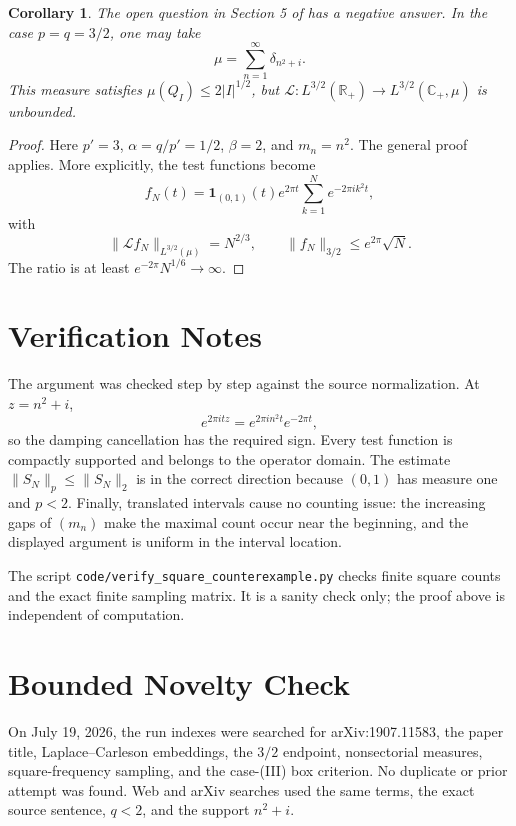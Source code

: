 \documentclass[11pt]{article}
\newtheorem{corollary}{Corollary}
\newcommand{\R}{\mathbb R}
\newcommand{\C}{\mathbb C}
\begin{document}
\begin{corollary}\label{cor:source}
The open question in Section 5 of \cite{Rydhe} has a negative answer.  In the
case $p=q=3/2$, one may take
\[
 \mu=\sum_{n=1}^\infty\delta_{n^2+i}.
\]
This measure satisfies $\mu(Q_I)\le2|I|^{1/2}$, but
$\mathcal L:L^{3/2}(\R_+)\to L^{3/2}(\C_+,\mu)$ is unbounded.
\end{corollary}

\begin{proof}
Here $p'=3$, $\alpha=q/p'=1/2$, $\beta=2$, and $m_n=n^2$.  The general proof
applies.  More explicitly, the test functions become
\[
 f_N(t)=\mathbf 1_{(0,1)}(t)e^{2\pi t}
        \sum_{k=1}^N e^{-2\pi i k^2t},
\]
with
\[
 \|\mathcal Lf_N\|_{L^{3/2}(\mu)}=N^{2/3},
 \qquad
 \|f_N\|_{3/2}\le e^{2\pi}\sqrt N.
\]
The ratio is at least $e^{-2\pi}N^{1/6}\to\infty$.
\end{proof}

\section*{Verification Notes}

The argument was checked step by step against the source normalization.  At
$z=n^2+i$,
\[
 e^{2\pi i t z}=e^{2\pi i n^2t}e^{-2\pi t},
\]
so the damping cancellation has the required sign.  Every test function is
compactly supported and belongs to the operator domain.  The estimate
$\|S_N\|_p\le\|S_N\|_2$ is in the correct direction because $(0,1)$ has
measure one and $p<2$.  Finally, translated intervals cause no counting issue:
the increasing gaps of $(m_n)$ make the maximal count occur near the beginning,
and the displayed argument is uniform in the interval location.

The script \texttt{code/verify\_square\_counterexample.py} checks finite square
counts and the exact finite sampling matrix.  It is a sanity check only; the
proof above is independent of computation.

\section*{Bounded Novelty Check}

On July 19, 2026, the run indexes were searched for arXiv:1907.11583, the paper
title, Laplace--Carleson embeddings, the $3/2$ endpoint, nonsectorial measures,
square-frequency sampling, and the case-(III) box criterion.  No duplicate or
prior attempt was found.  Web and arXiv searches used the same terms, the exact
source sentence, $q<2$, and the support $n^2+i$.
\end{document}
